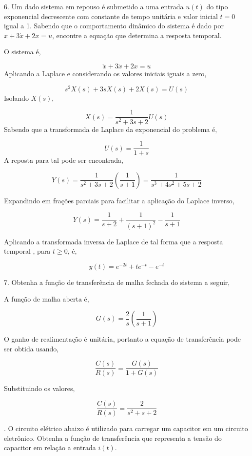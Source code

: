 \documentclass[paper=a4, fontsize=11pt]{article}
\begin{document}
\newpage

6. Um dado sistema em repouso é submetido a uma entrada $u(t)$ do tipo exponencial
decrescente com constante de tempo unitária e valor inicial $t=0$ igual a 1. Sabendo
que o comportamento dinâmico do sistema é dado por $\ddot{x} + 3 \dot{x} + 2 x = u$,
encontre a equação que determina a resposta temporal.

O sistema é,

$$
\ddot{x} + 3 \dot{x} + 2 x = u
$$
Aplicando a Laplace e considerando os valores iniciais iguais a zero,

$$
s^2 X(s) + 3 s X(s) + 2 X(s) = U(s)
$$
Isolando $X(s)$,

$$
X(s) = \frac{1}{s^2 + 3s + 2} U(s)
$$
Sabendo que a transformada de Laplace da exponencial do problema é,

$$
U(s)=\frac{1}{1+s}
$$
A reposta para tal pode ser encontrada,

$$
Y(s) = \frac{1}{s^2 + 3s + 2} \left(\frac{1}{s+1}\right) = \frac{1}{s^3 + 4 s^2 + 5 s +2}
$$

Expandindo em frações parciais para facilitar a aplicação do Laplace inverso,

$$
Y(s) = \frac{1}{s+2} + \frac{1}{(s+1)^2} - \frac{1}{s+1}
$$

Aplicando a transformada inversa de Laplace de tal forma que a resposta temporal , para $t\geq0$, é,

$$
y(t) = e^{-2t} + t e^{-t} - e^{-t}
$$

\newpage

7. Obtenha a função de transferência de malha fechada do sistema a seguir,

A função de malha aberta é,

$$
G(s) = \frac{2}{s} \left(\frac{1}{s+1}\right)
$$

O ganho de realimentação é unitária, portanto a equação de transferência pode ser 
obtida usando,

$$
\frac{C(s)}{R(s)} = \frac{G(s)}{1 + G(s)}
$$

Substituindo os valores,

$$
\frac{C(s)}{R(s)} = \frac{2}{s^2+s+2}
$$


. O circuito elétrico abaixo é utilizado para carregar um capacitor em um circuito eletrônico.
Obtenha a função de transferência que representa a tensão do capacitor em relação a entrada
$i(t)$.
\end{document}
